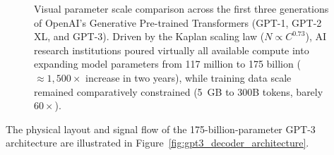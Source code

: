 \documentclass[../../main.tex]{subfiles}
\begin{document}
\begin{figure}[htbp]
{%
}
\caption{Visual parameter scale comparison across the first three generations of OpenAI's Generative Pre-trained Transformers (GPT-1, GPT-2 XL, and GPT-3). Driven by the Kaplan scaling law ($N \propto C^{0.73}$), AI research institutions poured virtually all available compute into expanding model parameters from 117 million to 175 billion ($\approx 1,500\times$ increase in two years), while training data scale remained comparatively constrained (5~GB to 300B tokens, barely $60\times$).}
\label{fig:gpt_family_scale_comparison}
\end{figure}

The physical layout and signal flow of the 175-billion-parameter GPT-3 architecture are illustrated in Figure~\ref{fig:gpt3_decoder_architecture}.
\end{document}
